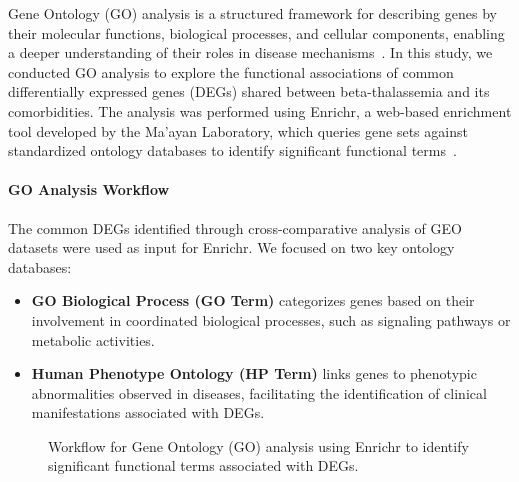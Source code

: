 Gene Ontology (GO) analysis is a structured framework for describing genes by their molecular functions, biological processes, and cellular components, enabling a deeper understanding of their roles in disease mechanisms~\cite{go_ref}. In this study, we conducted GO analysis to explore the functional associations of common differentially expressed genes (DEGs) shared between beta-thalassemia and its comorbidities. The analysis was performed using Enrichr, a web-based enrichment tool developed by the Ma'ayan Laboratory, which queries gene sets against standardized ontology databases to identify significant functional terms~\cite{go_ref}.

\paragraph{GO Analysis Workflow}

The common DEGs identified through cross-comparative analysis of GEO datasets were used as input for Enrichr. We focused on two key ontology databases:
\begin{itemize}
    \item \textbf{GO Biological Process (GO Term)} categorizes genes based on their involvement in coordinated biological processes, such as signaling pathways or metabolic activities.
    \item \textbf{Human Phenotype Ontology (HP Term)} links genes to phenotypic abnormalities observed in diseases, facilitating the identification of clinical manifestations associated with DEGs.
\end{itemize}

\begin{figure}[h]
\centering
{}
\caption{Workflow for Gene Ontology (GO) analysis using Enrichr to identify significant functional terms associated with DEGs.}
\label{fig:go_workflow}
\end{figure}

\vspace*{-\parskip} %
